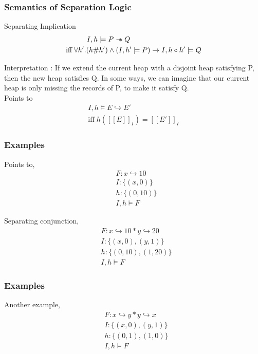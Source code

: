 \documentclass{beamer}
\newcommand\sepimp{\mathrel{-\mkern-6mu*}}
\begin{document}
\begin{frame}
\frametitle{Semantics of Separation Logic}

Separating Implication
\begin{align*}
    I,h \models P \sepimp Q \hspace{3.5cm} \\ 
    \textrm{iff} \; \forall h'.(h \# h') \land (I,h' \models P) \to I,h \circ h' \models Q
\end{align*}

Interpretation : If we extend the current heap with a disjoint heap satisfying P, then the new heap satisfies Q. In some ways, we can imagine that our current heap is only missing the records of P, to make it satisfy Q.
\vspace{0.5cm} \\

Points to
\begin{align*}
    I,h \models E \hookrightarrow E' \\ 
    \textrm{iff} \; h([\![ E ]\!]_I) = [\![ E' ]\!]_I
\end{align*}
\end{frame}

\begin{frame}
\frametitle{Examples}
Points to, 
\begin{align*}
    & F : x \hookrightarrow 10 \\
    & I : \{(x,0)\} \\
    & h : \{(0,10)\} \\
    & I,h \models F
\end{align*}

Separating conjunction,
\begin{align*}
    & F : x \hookrightarrow 10 * y \hookrightarrow 20 \\
    & I : \{ (x,0), (y,1) \} \\
    & h : \{(0,10), (1,20)\} \\
    & I,h \models F
\end{align*}
\end{frame}

\begin{frame}
\frametitle{Examples}
Another example,
\begin{align*}
    & F : x \hookrightarrow y * y \hookrightarrow x \\
    & I : \{(x,0), (y,1)\} \\
    & h : \{(0,1), (1, 0)\} \\
    & I,h \models F
\end{align*}
\end{frame}
\end{document}
